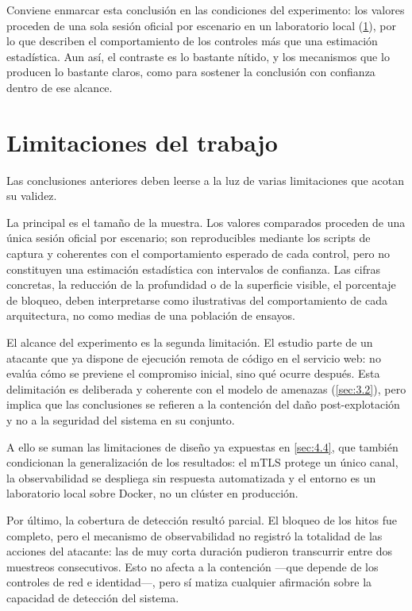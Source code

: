 \documentclass[11pt,spanish,listoffigures,listoftables]{tfgetsinf}
\begin{document}
        Conviene enmarcar esta conclusión en las condiciones del experimento: los valores proceden de una sola sesión oficial por escenario en un laboratorio local (\cref{sec:7.2}), por lo que describen el comportamiento de los controles más que una estimación estadística. Aun así, el contraste es lo bastante nítido, y los mecanismos que lo producen lo bastante claros, como para sostener la conclusión con confianza dentro de ese alcance.

        \section{Limitaciones del trabajo}
        \label{sec:7.2}
        Las conclusiones anteriores deben leerse a la luz de varias limitaciones que acotan su validez.

        La principal es el tamaño de la muestra. Los valores comparados proceden de una única sesión oficial por escenario; son reproducibles mediante los scripts de captura y coherentes con el comportamiento esperado de cada control, pero no constituyen una estimación estadística con intervalos de confianza. Las cifras concretas, la reducción de la profundidad o de la superficie visible, el porcentaje de bloqueo, deben interpretarse como ilustrativas del comportamiento de cada arquitectura, no como medias de una población de ensayos.

        El alcance del experimento es la segunda limitación. El estudio parte de un atacante que ya dispone de ejecución remota de código en el servicio web: no evalúa cómo se previene el compromiso inicial, sino qué ocurre después. Esta delimitación es deliberada y coherente con el modelo de amenazas (\cref{sec:3.2}), pero implica que las conclusiones se refieren a la contención del daño post-explotación y no a la seguridad del sistema en su conjunto.

        A ello se suman las limitaciones de diseño ya expuestas en \cref{sec:4.4}, que también condicionan la generalización de los resultados: el mTLS protege un único canal, la observabilidad se despliega sin respuesta automatizada y el entorno es un laboratorio local sobre Docker, no un clúster en producción.

        Por último, la cobertura de detección resultó parcial. El bloqueo de los hitos fue completo, pero el mecanismo de observabilidad no registró la totalidad de las acciones del atacante: las de muy corta duración pudieron transcurrir entre dos muestreos consecutivos. Esto no afecta a la contención —que depende de los controles de red e identidad—, pero sí matiza cualquier afirmación sobre la capacidad de detección del sistema.
\end{document}
